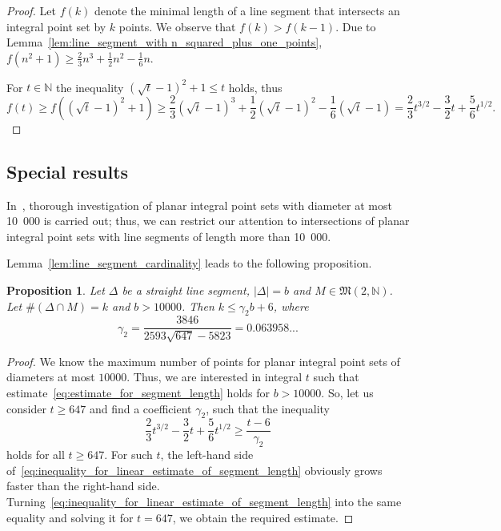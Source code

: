 \documentclass[a4paper,14pt]{article} %
\theoremstyle{plain}
\newtheorem{proposition}[theorem]{Proposition}
\theoremstyle{definition}
\begin{document}
\begin{proof}
	Let $f(k)$ denote the minimal length of a line segment
	that intersects an integral point set by $k$ points.
	We observe that $f(k) > f (k-1)$.
	Due to Lemma~\ref{lem:line_segment_with n_squared_plus_one_points},
	$f(n^2+1) \geq \frac{2}{3}n^3+\frac{1}{2}n^2-\frac{1}{6}n$.

	For $t\in\mathbb{N}$ the inequality $(\sqrt{t} - 1)^2 +1 \leq t$ holds,
	thus
	\begin{equation}
		\label{eq:line_segment_length}
		f(t) \geq f((\sqrt{t} - 1)^2 +1) \geq \frac{2}{3}(\sqrt{t} - 1)^3+\frac{1}{2}(\sqrt{t} - 1)^2-\frac{1}{6}(\sqrt{t} - 1)
		=
		\frac{2}{3}t^{3/2}-\frac{3}{2}t+\frac{5 }{6}t^{1/2}
		.
	\end{equation}
\end{proof}

\subsection{Special results}

In~\cite{kurz2008bounds}, thorough investigation of planar integral point sets with diameter at most 10~000
is carried out;
thus, we can restrict our attention to intersections of planar integral point sets with line segments of length more than 10~000.

Lemma~\ref{lem:line_segment_cardinality} leads to the following proposition.

\begin{proposition}
	\label{obs:estimate_points_on_straight_line}
	Let $\Delta$ be a straight line segment, $|\Delta| = b$ and $M \in \mathfrak{M}(2,\mathbb{N})$.
	Let $\#(\Delta \cap M) = k$ and $b>10000$.
	Then $k \leq \gamma_2 b + 6$,
	where
	\begin{equation}
		\gamma_2 = \frac{3846}{2593 \sqrt{647}-5823} = 0.063958...
	\end{equation}
\end{proposition}

\begin{proof}
	We know the maximum number of points for planar integral point sets of diameters at most $10000$.
	Thus, we are interested in integral $t$ such that estimate~\eqref{eq:estimate_for_segment_length}
	holds for $b > 10000$.
	So, let us consider $t\geq 647$ and find a coefficient $\gamma_2$,
	such that the inequality
	\begin{equation}
		\label{eq:inequality_for_linear_estimate_of_segment_length}
		\frac{2}{3}t^{3/2}-\frac{3}{2}t+\frac{5 }{6}t^{1/2} \geq \frac{t-6}{\gamma_2}
	\end{equation}
	holds for all $t\geq 647$.
	For such $t$,
	the left-hand side of~\eqref{eq:inequality_for_linear_estimate_of_segment_length} obviously grows faster than the right-hand side.
	Turning~\eqref{eq:inequality_for_linear_estimate_of_segment_length} into the same equality
	and solving it for $t=647$, we obtain the required estimate.
\end{proof}
\end{document}
